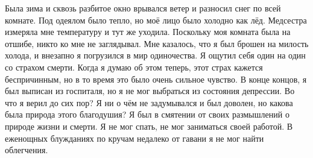 \documentclass[a4paper]{book}
\begin{document}
Была зима и сквозь разбитое окно врывался ветер и разносил снег по всей комнате. Под
одеялом было тепло, но моё лицо было холодно как лёд. Медсестра измеряла мне
температуру и тут же уходила. Поскольку моя комната была на отшибе, никто ко мне не
заглядывал. Мне казалось, что я был брошен на милость холода, и внезапно я погрузился в
мир одиночества. Я ощутил себя один на один со страхом смерти. Когда я думаю об этом
теперь, этот страх кажется беспричинным, но в то время это было очень сильное чувство.
В конце концов, я был выписан из госпиталя, но я не мог выбраться из состояния
депрессии. Во что я верил до сих пор? Я ни о чём не задумывался и был доволен, но какова
была природа этого благодушия? Я был в смятении от своих размышлений о природе жизни и
смерти. Я не мог спать, не мог заниматься своей работой. В еженощных блужданиях по
кручам недалеко от гавани я не мог найти облегчения.
\end{document}
